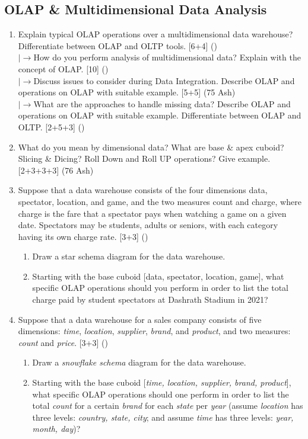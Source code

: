 \documentclass[12pt]{article}
\newcommand{\lb}{\\$\left|\rightarrow\right.$}
\begin{document}
  \subsection{OLAP \& Multidimensional Data Analysis}
    \begin{enumerate}[topsep=0pt, noitemsep]
      \item Explain typical OLAP operations over a multidimensional data warehouse? Differentiate between OLAP and OLTP tools. \hfill [6+4] ()
        \lb How do you perform analysis of multidimensional data? Explain with the concept of OLAP. \hfill [10] ()
        \lb Discuss issues to consider during Data Integration. Describe OLAP and operations on OLAP with suitable example. \hfill [5+5] (75 Ash)
        \lb What are the approaches to handle missing data? Describe OLAP and operations on OLAP with suitable example. Differentiate between OLAP and OLTP. \hfill [2+5+3] ()

      \item What do you mean by dimensional data? What are base \& apex cuboid? Slicing \& Dicing? Roll Down and Roll UP operations? Give example. \hfill [2+3+3+3] (76 Ash)

      \item Suppose that a data warehouse consists of the four dimensions data, spectator, location, and game, and the two measures count and charge, where charge is the fare that a spectator pays when watching a game on a given date. Spectators may be students, adults or seniors, with each category having its own charge rate. \hfill [3+3] ()
        \begin{enumerate}[label=\alph*),topsep=0pt,noitemsep]
          \item Draw a star schema diagram for the data warehouse.
          \item Starting with the base cuboid [data, spectator, location, game], what specific OLAP operations should you perform in order to list the total charge paid by student spectators at Dashrath Stadium in 2021?
        \end{enumerate}

      \item Suppose that a data warehouse for a sales company consists of five dimensions: \emph{time}, \emph{location}, \emph{supplier}, \emph{brand}, and \emph{product}, and two measures: \emph{count} and \emph{price}. \hfill [3+3] ()
        \begin{enumerate}[label=(\alph*),topsep=0pt,noitemsep]
          \item Draw a \emph{snowflake schema} diagram for the data warehouse.
          \item Starting with the base cuboid [\emph{time, location, supplier, brand, product}], what specific OLAP operations should one perform in order to list the total \emph{count} for a certain \emph{brand} for each \emph{state} per \emph{year} (assume \emph{location} has three levels: \emph{country, state, city}; and assume \emph{time} has three levels: \emph{year, month, day})?
        \end{enumerate}


\end{enumerate}
\end{document}
